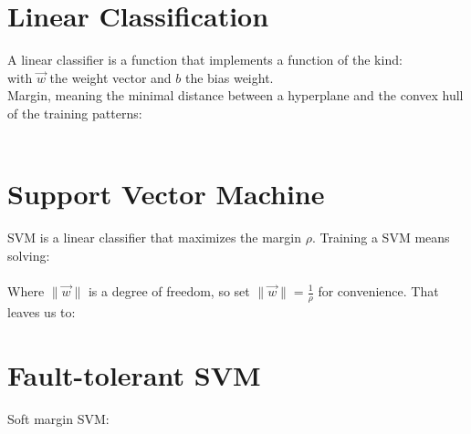 \documentclass[a4paper,12pt,pdftex]{scrreprt}
\begin{document}
	\section{Linear Classification} %
	\label{sec:linear_classification}
	A linear classifier is a function that implements a function of the kind:\\
	 with $\vec{w}$ the weight vector and $b$ the bias weight.\\
	Margin, meaning the minimal distance between a hyperplane and the convex hull of the training patterns:\\
	\\
	
	\section{Support Vector Machine} %
	\label{sec:support_vector_machine}
	SVM is a linear classifier that maximizes the margin $\rho$. Training a SVM means solving:\\
	\\
	Where $\| \vec{w} \|$ is a degree of freedom, so set $\| \vec{w} \| = \frac{1}{\rho}$ for convenience. That leaves us to:\\

	\section{Fault-tolerant SVM} %
	\label{sec:fault_tolerant_svm}
	Soft margin SVM:\\
\end{document}
